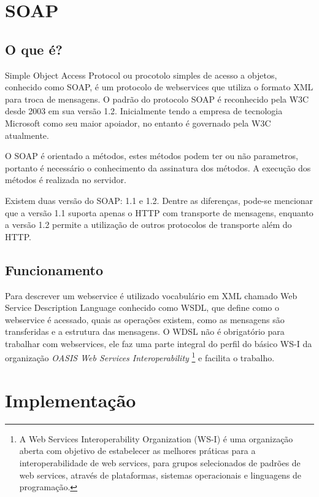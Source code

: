 \documentclass{acm_proc_article-sp}
\begin{document}
\section{SOAP}

	\subsection{O que é?}
	
		Simple Object Access Protocol ou procotolo simples de acesso a objetos, conhecido como SOAP, é um protocolo de webservices que utiliza o formato XML para troca de mensagens. O padrão do protocolo SOAP é reconhecido pela W3C desde 2003 em sua versão 1.2. Inicialmente tendo a empresa de tecnologia Microsoft como seu maior apoiador, no entanto é governado pela W3C atualmente.
		
		O SOAP é orientado a métodos, estes métodos podem ter ou não parametros, portanto é necessário o conhecimento da assinatura dos métodos. A execução dos métodos é realizada no servidor.
		
		Existem duas versão do SOAP: 1.1 e 1.2. Dentre as diferenças, pode-se mencionar que a versão 1.1 suporta apenas o HTTP com transporte de mensagens, enquanto a versão 1.2 permite a utilização de outros protocolos de transporte além do HTTP. \cite{WEBSERVICESZEND}
		
	\subsection{Funcionamento}
	
		Para descrever um webservice é utilizado vocabulário em XML chamado Web Service Description Language conhecido como WSDL, que define como o webservice é acessado, quais as operações existem, como as mensagens são transferidas e a estrutura das mensagens. O WDSL não é obrigatório para trabalhar com webservices, ele faz uma parte integral do perfil do básico WS-I da organização \emph{OASIS Web Services Interoperability} \footnote{A Web Services Interoperability Organization (WS-I) é uma organização aberta com objetivo de estabelecer as melhores práticas para a interoperabilidade de web services, para grupos selecionados de padrões de web services, através de plataformas, sistemas operacionais e linguagens de programação.\cite{OASIS-WS-I-SITE}} e facilita o trabalho. 
		
		
\section{Implementação}
\end{document}
